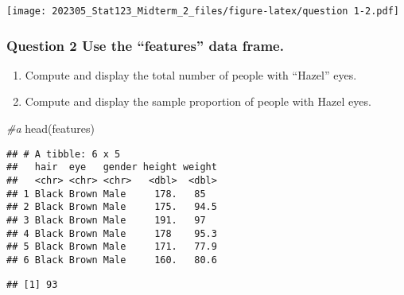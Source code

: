 \documentclass[
]{article}
\newenvironment{Shaded}{\begin{snugshade}}{\end{snugshade}}
\newcommand{\CommentTok}[1]{\textcolor[rgb]{0.56,0.35,0.01}{\textit{#1}}}
\newcommand{\ControlFlowTok}[1]{\textcolor[rgb]{0.13,0.29,0.53}{\textbf{#1}}}
\newcommand{\DecValTok}[1]{\textcolor[rgb]{0.00,0.00,0.81}{#1}}
\newcommand{\FunctionTok}[1]{\textcolor[rgb]{0.00,0.00,0.00}{#1}}
\newcommand{\NormalTok}[1]{#1}
\newcommand{\OtherTok}[1]{\textcolor[rgb]{0.56,0.35,0.01}{#1}}
\newcommand{\SpecialCharTok}[1]{\textcolor[rgb]{0.00,0.00,0.00}{#1}}
\newcommand{\StringTok}[1]{\textcolor[rgb]{0.31,0.60,0.02}{#1}}
\begin{document}
\texttt{[image: 202305\_Stat123\_Midterm\_2\_files/figure-latex/question 1-2.pdf]}

\hypertarget{question-2-use-the-features-data-frame.}{%
\subsubsection{Question 2 Use the ``features'' data
frame.}\label{question-2-use-the-features-data-frame.}}

\begin{enumerate}
\def\labelenumi{\alph{enumi}.}
\item
  Compute and display the total number of people with ``Hazel'' eyes.
\item
  Compute and display the sample proportion of people with Hazel eyes.
\end{enumerate}

\begin{Shaded}
\begin{Highlighting}[]
\CommentTok{\#a}
\FunctionTok{head}\NormalTok{(features)}
\end{Highlighting}
\end{Shaded}

\begin{verbatim}
## # A tibble: 6 x 5
##   hair  eye   gender height weight
##   <chr> <chr> <chr>   <dbl>  <dbl>
## 1 Black Brown Male     178.   85  
## 2 Black Brown Male     175.   94.5
## 3 Black Brown Male     191.   97  
## 4 Black Brown Male     178    95.3
## 5 Black Brown Male     171.   77.9
## 6 Black Brown Male     160.   80.6
\end{verbatim}

\begin{Shaded}
\end{Shaded}

\begin{verbatim}
## [1] 93
\end{verbatim}
\end{document}
